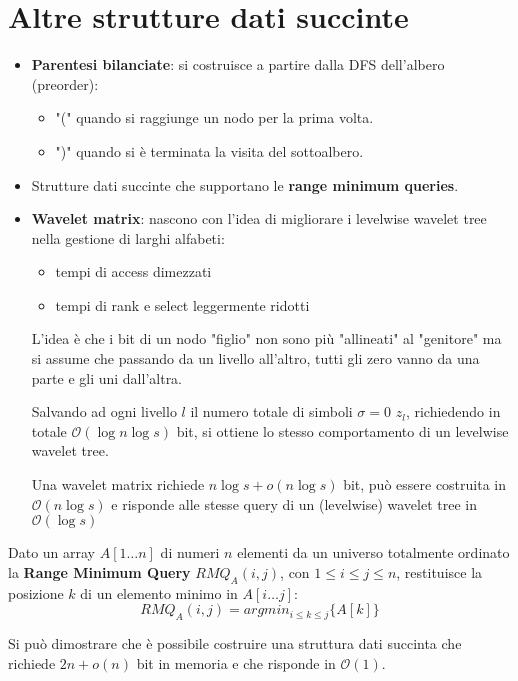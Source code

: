 \section{Altre strutture dati succinte}
\begin{itemize}
    \item \textbf{Parentesi bilanciate}: si costruisce a partire dalla DFS
          dell'albero (preorder):
          \begin{itemize}
              \item "(" quando si raggiunge un nodo per la prima volta.
              \item ")" quando si è terminata la visita del sottoalbero.
          \end{itemize}
    \item Strutture dati succinte che supportano le \textbf{range minimum queries}.
    \item \textbf{Wavelet matrix}: nascono con l'idea di migliorare i levelwise
          wavelet tree nella gestione di larghi alfabeti:
          \begin{itemize}
              \item tempi di access dimezzati
              \item tempi di rank e select leggermente ridotti
          \end{itemize}

          L'idea è che i bit di un nodo "figlio" non sono più "allineati" al
          "genitore" ma si assume che passando da un livello all'altro, tutti gli
          zero vanno da una parte e gli uni dall'altra.

          Salvando ad ogni livello $l$ il numero totale di simboli $\sigma = 0$
          $z_l$, richiedendo in totale $\mathcal{O}(\log n \log s)$ bit, si ottiene
          lo stesso comportamento di un levelwise wavelet tree.

          Una wavelet matrix richiede $n \log s + o(n \log s)$ bit, può essere
          costruita in $\mathcal{O}(n \log s)$ e risponde alle stesse query di un
          (levelwise) wavelet tree in $\mathcal{O}(\log s)$
\end{itemize}

\begin{definizione}
    Dato un array $A[1\dots n]$ di numeri $n$ elementi da un universo totalmente
    ordinato la \textbf{Range Minimum Query} $RMQ_A(i, j)$, con $1 \leq i \leq j \leq n$,
    restituisce la posizione $k$ di un elemento minimo in $A[i \dots j]$:$$RMQ_A(i, j) = argmin_{i \leq k \leq j}\{A[k]\}$$

    Si può dimostrare che è possibile costruire una struttura dati succinta che
    richiede $2n + o(n)$ bit in memoria e che risponde in $\mathcal{O}(1)$.
\end{definizione}

